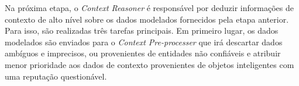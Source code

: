 \documentclass[tid,table]{texufpel} %
\begin{document}

Na próxima etapa, o \textit{Context Reasoner} é responsável por deduzir informações de contexto de alto nível sobre os dados modelados fornecidos pela etapa anterior. Para isso, são realizadas três tarefas principais. Em primeiro lugar, os dados modelados são enviados para o \textit{Context Pre-processer} que irá descartar dados ambíguos e imprecisos, ou provenientes de entidades não confiáveis e atribuir menor prioridade aos dados de contexto provenientes de objetos inteligentes com uma reputação questionável. 
\end{document}
